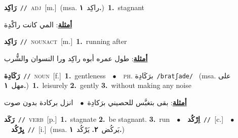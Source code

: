 \documentclass[10pt,a4paper,twoside]{article} %
\begin{document}
\begin{multicols}{2}
{\setlength\topsep{0pt}\textbf{\foreignlanguage{arabic}{رَاكِد}}\ {\color{gray}\texttt{//}\color{black}}\ \textsc{adj}\ [m.]\ \color{gray}(msa. \foreignlanguage{arabic}{راكِد}~\foreignlanguage{arabic}{\textbf{١.}})\color{black}\ \textbf{1.}~stagnant\  \begin{flushright}\color{gray}\foreignlanguage{arabic}{\textbf{\underline{\foreignlanguage{arabic}{أمثلة}}}: المي كانت راكْدِة}\end{flushright}\color{black}} \vspace{2mm}

{\setlength\topsep{0pt}\textbf{\foreignlanguage{arabic}{رَاكِد}}\ {\color{gray}\texttt{//}\color{black}}\ \textsc{noun\textunderscore act}\ [m.]\ \textbf{1.}~running after\  \begin{flushright}\color{gray}\foreignlanguage{arabic}{\textbf{\underline{\foreignlanguage{arabic}{أمثلة}}}: طول عمره أبوه راكِد ورا النسوان والشُّرب}\end{flushright}\color{black}} \vspace{2mm}

{\setlength\topsep{0pt}\textbf{\foreignlanguage{arabic}{رَكَادِة}}\ {\color{gray}\texttt{//}\color{black}}\ \textsc{noun}\ [f.]\ \textbf{1.}~gentleness\ \ $\bullet$\ \ \textsc{ph.} \color{gray} \foreignlanguage{arabic}{برَكَادِة}\color{black}\ {\color{gray}\texttt{/{\sffamily bratʃade}/}\color{black}}\ \color{gray} (msa. \foreignlanguage{arabic}{على مهل}~\foreignlanguage{arabic}{\textbf{١.}})\color{black}\ \textbf{1.}~leisurely  \textbf{2.}~gently  \textbf{3.}~without making any noise\  \begin{flushright}\color{gray}\foreignlanguage{arabic}{\textbf{\underline{\foreignlanguage{arabic}{أمثلة}}}: بقى بتغبَّس للحصيني برَكادِة\ $\bullet$\ \  انزل بركادة بدون صوت}\end{flushright}\color{black}} \vspace{2mm}

{\setlength\topsep{0pt}\textbf{\foreignlanguage{arabic}{رَكَد}}\ {\color{gray}\texttt{//}\color{black}}\ \textsc{verb}\ [p.]\ \textbf{1.}~stagnate  \textbf{2.}~be stagnant.  \textbf{3.}~run\ \ $\bullet$\ \ \setlength\topsep{0pt}\textbf{\foreignlanguage{arabic}{اِرْكُد}}\ {\color{gray}\texttt{//}\color{black}}\ [c.]\ \ $\bullet$\ \ \setlength\topsep{0pt}\textbf{\foreignlanguage{arabic}{يِرْكُد}}\ {\color{gray}\texttt{//}\color{black}}\ [i.]\ \color{gray}(msa. \foreignlanguage{arabic}{يَركُض}~\foreignlanguage{arabic}{\textbf{٢.}}  \foreignlanguage{arabic}{يَرْكُد}~\foreignlanguage{arabic}{\textbf{١.}})\color{black}\ } \vspace{2mm}


\end{multicols}
\end{document}
